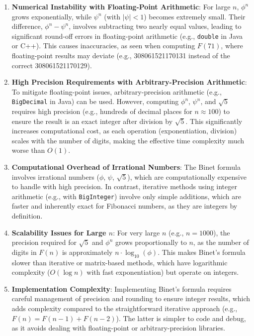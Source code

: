 \documentclass{article}
\begin{document}
\begin{enumerate}
	\item \textbf{Numerical Instability with Floating-Point Arithmetic}:
	For large \(n\), \(\phi^n\) grows exponentially, while \(\psi^n\) (with \(|\psi| < 1\)) becomes extremely small. Their difference, \(\phi^n - \psi^n\), involves subtracting two nearly equal values, leading to significant round-off errors in floating-point arithmetic (e.g., \texttt{double} in Java or C++). This causes inaccuracies, as seen when computing \(F(71)\), where floating-point results may deviate (e.g., 308061521170131 instead of the correct 308061521170129).
	
	\item \textbf{High Precision Requirements with Arbitrary-Precision Arithmetic}:
	To mitigate floating-point issues, arbitrary-precision arithmetic (e.g., \texttt{BigDecimal} in Java) can be used. However, computing \(\phi^n\), \(\psi^n\), and \(\sqrt{5}\) requires high precision (e.g., hundreds of decimal places for \(n \approx 100\)) to ensure the result is an exact integer after division by \(\sqrt{5}\). This significantly increases computational cost, as each operation (exponentiation, division) scales with the number of digits, making the effective time complexity much worse than \(O(1)\).
	
	\item \textbf{Computational Overhead of Irrational Numbers}:
	The Binet formula involves irrational numbers (\(\phi\), \(\psi\), \(\sqrt{5}\)), which are computationally expensive to handle with high precision. In contrast, iterative methods using integer arithmetic (e.g., with \texttt{BigInteger}) involve only simple additions, which are faster and inherently exact for Fibonacci numbers, as they are integers by definition.
	
	\item \textbf{Scalability Issues for Large \(n\)}:
	For very large \(n\) (e.g., \(n = 1000\)), the precision required for \(\sqrt{5}\) and \(\phi^n\) grows proportionally to \(n\), as the number of digits in \(F(n)\) is approximately \(n \cdot \log_{10}(\phi)\). This makes Binet's formula slower than iterative or matrix-based methods, which have logarithmic complexity (\(O(\log n)\) with fast exponentiation) but operate on integers.
	
	\item \textbf{Implementation Complexity}:
	Implementing Binet's formula requires careful management of precision and rounding to ensure integer results, which adds complexity compared to the straightforward iterative approach (e.g., \(F(n) = F(n-1) + F(n-2)\)). The latter is simpler to code and debug, as it avoids dealing with floating-point or arbitrary-precision libraries.
\end{enumerate}
\end{document}
